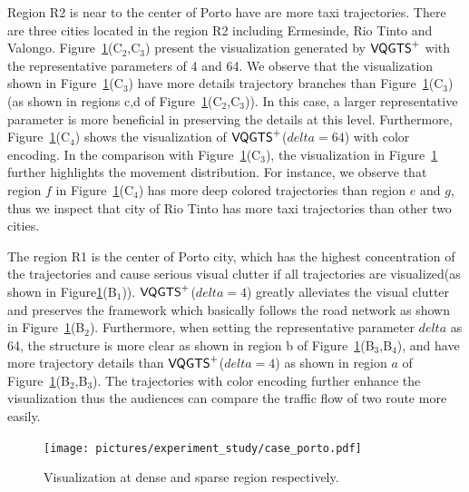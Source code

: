 Region R2 is near to the center of Porto have are more taxi trajectories. There are three cities located in the region R2 including Ermesinde, Rio Tinto and Valongo.  
Figure~\ref{fig:porto}(C$_2$,C$_3$) present the visualization generated by $\mathsf{VQGTS}^{+}$ with the representative parameters of 4 and 64. We observe that the visualization shown in Figure~\ref{fig:porto}(C$_3$) have more details trajectory branches than Figure~\ref{fig:porto}(C$_3$)(as shown in regions c,d of Figure~\ref{fig:porto}(C$_2$,C$_3$)). In this case, a larger representative parameter is more beneficial in preserving the details at this level. Furthermore, Figure~\ref{fig:porto}(C$_4$) shows the visualization of $\mathsf{VQGTS}^{+}$($delta = 64$) with color encoding. In the comparison with Figure~\ref{fig:porto}(C$_3$), the visualization in Figure~\ref{fig:porto} further highlights the movement distribution. 
For instance, we observe that region $f$ in Figure~\ref{fig:porto}(C$_4$) has more deep colored trajectories than region $e$ and $g$, thus we inspect that city of Rio Tinto has more taxi trajectories than other two cities.

The region R1 is the center of Porto city, which has the highest concentration of the trajectories and cause serious visual clutter if all trajectories are visualized(as shown in Figure\ref{fig:porto}(B$_1$)). $\mathsf{VQGTS}^{+}$($delta = 4$) greatly alleviates the visual clutter and preserves the framework which basically follows the road network as shown in Figure~\ref{fig:porto}(B$_2$). Furthermore, when setting the representative parameter $delta$ as 64, the structure is more clear as shown in region b of Figure~\ref{fig:porto}(B$_3$,B$_4$), and have more trajectory details than $\mathsf{VQGTS}^{+}$($delta = 4$) as shown in region $a$ of Figure~\ref{fig:porto}(B$_2$,B$_3$). The trajectories with color encoding further enhance the visualization thus the audiences can compare the traffic flow of two route more easily.   
 
 

\begin{figure}[t]
	\centering
	\vspace{2mm}
	\texttt{[image: pictures/experiment\_study/case\_porto.pdf]}
	\caption{Visualization at dense and sparse region respectively.}
	\vspace{0mm}
	\label{fig:porto}
\end{figure}


